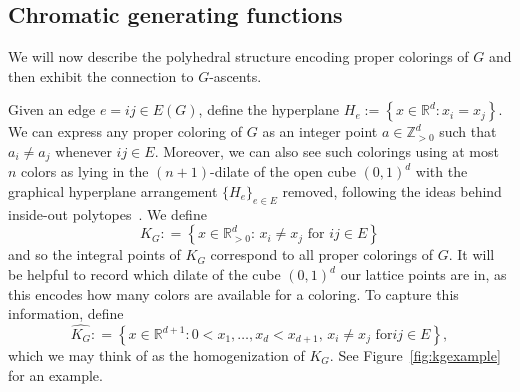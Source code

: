 \documentclass[11pt]{amsart}
\begin{document}
\subsection{Chromatic generating functions}
We will now describe the polyhedral structure encoding proper colorings of $G$ and then exhibit the connection to $G$-ascents. 

Given an edge $e = ij \in E(G)$, define the hyperplane $H_e := \left\{ x\in\mathbb{R}^d:x_i = x_j\right\}$. 
We can express any proper coloring of $G$ as an integer point $a \in \mathbb{Z}_{ >0 }^d$ such that $a_i
\neq a_j$ whenever $ij \in E$. 
Moreover, we can also see such colorings using at most $n$ colors as lying in the $(n+1)$-dilate of the open
cube $(0,1)^d$ with the graphical hyperplane arrangement $\{H_e\}_{e \in E}$ removed, following the ideas
behind inside-out polytopes~\cite{iop}.
We define
\[
    K_G : = \left\{x \in \mathbb{R}_{> 0}^{d} : \, x_i \neq x_j \text{ for } ij \in E \right\}
\]
and so the integral points of $K_G$ correspond to all proper colorings of $G$.
It will be helpful to record which dilate of the cube $(0,1)^d$ our lattice points are in, as this encodes how many colors are available for a coloring. 
To capture this information, define
\[
    \widehat{K_G} : = \left\{x \in \mathbb{R}^{d+1} : 0< x_1, \ldots, x_d < x_{d+1}, \, x_i \neq x_j \text{ for
} ij \in E \right\},
\]
which we may think of as the homogenization of $K_G$. %
See Figure~\ref{fig:kgexample} for an example.
\end{document}
